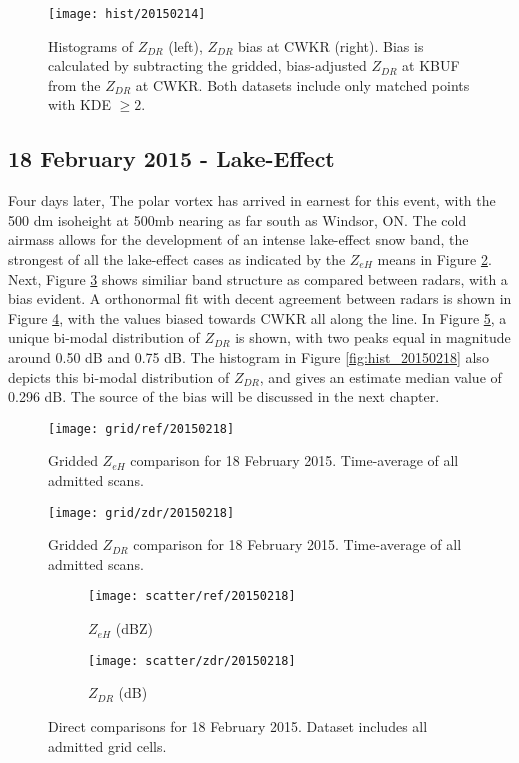 \begin{figure}[p]
\texttt{[image: hist/20150214]}\centering
\caption{Histograms of $Z_{DR}$ (left), $Z_{DR}$ bias at CWKR (right). Bias is calculated by subtracting the gridded, bias-adjusted $Z_{DR}$ at KBUF from the
$Z_{DR}$ at CWKR. Both datasets include only matched points with KDE $\geq 2$.} 
\label{fig:hist_20150214}
\end{figure}

\subsection{18 February 2015 - Lake-Effect}
Four days later, The polar vortex has arrived in earnest for this event, with the 500 dm isoheight at 500mb nearing as far south as Windsor, ON. The cold airmass allows for the development of an intense lake-effect snow band, the strongest of all the lake-effect cases as indicated by the $Z_{eH}$ means in Figure \ref{fig:grid_ref_20150218}. Next, Figure \ref{fig:grid_zdr_20150218} shows similiar band structure as compared between radars, with a bias evident. A orthonormal fit with decent agreement between radars is shown in Figure \ref{fig:scatter_ref_20150218}, with the values biased towards CWKR all along the line. In Figure \ref{fig:scatter_zdr_20150218}, a unique bi-modal distribution of $Z_{DR}$ is shown, with two peaks equal in magnitude around 0.50 dB and 0.75 dB. The histogram in Figure \ref{fig:hist_20150218} also depicts this bi-modal distribution of $Z_{DR}$, and gives an estimate median value of 0.296 dB. The source of the bias will be discussed in the next chapter. 
\begin{figure}[H]
\texttt{[image: grid/ref/20150218]}
\caption{Gridded $Z_{eH}$ comparison for 18 February 2015. Time-average of all admitted scans.} 
\label{fig:grid_ref_20150218}
\end{figure}

\begin{figure}[p]
\texttt{[image: grid/zdr/20150218]}
\caption{Gridded $Z_{DR}$ comparison for 18 February 2015. Time-average of all admitted scans.} 
\label{fig:grid_zdr_20150218}
\end{figure}

\begin{figure}[p]
\centering
   \begin{subfigure}{0.49\linewidth} \centering
     \texttt{[image: scatter/ref/20150218]}
     \caption{$Z_{eH}$ (dBZ)}\label{fig:scatter_ref_20150218}
   \end{subfigure}
   \begin{subfigure}{0.49\linewidth} \centering
     \texttt{[image: scatter/zdr/20150218]}
     \caption{$Z_{DR}$ (dB)}\label{fig:scatter_zdr_20150218}
   \end{subfigure}
\caption{Direct comparisons for 18 February 2015. Dataset includes all admitted grid cells.} \label{fig:scatter_20150218}
\end{figure}

